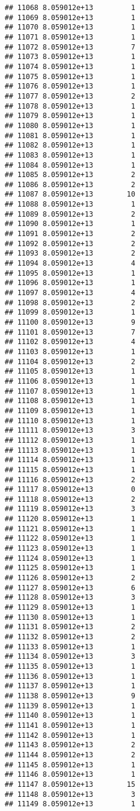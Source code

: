 \documentclass[
]{article}
\begin{document}
\begin{verbatim}
## 11068 8.059012e+13         1
## 11069 8.059012e+13         1
## 11070 8.059012e+13         1
## 11071 8.059012e+13         1
## 11072 8.059012e+13         7
## 11073 8.059012e+13         1
## 11074 8.059012e+13         1
## 11075 8.059012e+13         1
## 11076 8.059012e+13         1
## 11077 8.059012e+13         2
## 11078 8.059012e+13         1
## 11079 8.059012e+13         1
## 11080 8.059012e+13         1
## 11081 8.059012e+13         1
## 11082 8.059012e+13         1
## 11083 8.059012e+13         1
## 11084 8.059012e+13         1
## 11085 8.059012e+13         2
## 11086 8.059012e+13         2
## 11087 8.059012e+13        10
## 11088 8.059012e+13         1
## 11089 8.059012e+13         2
## 11090 8.059012e+13         1
## 11091 8.059012e+13         2
## 11092 8.059012e+13         2
## 11093 8.059012e+13         2
## 11094 8.059012e+13         4
## 11095 8.059012e+13         1
## 11096 8.059012e+13         1
## 11097 8.059012e+13         4
## 11098 8.059012e+13         2
## 11099 8.059012e+13         1
## 11100 8.059012e+13         9
## 11101 8.059012e+13         7
## 11102 8.059012e+13         4
## 11103 8.059012e+13         1
## 11104 8.059012e+13         2
## 11105 8.059012e+13         1
## 11106 8.059012e+13         1
## 11107 8.059012e+13         1
## 11108 8.059012e+13         1
## 11109 8.059012e+13         1
## 11110 8.059012e+13         1
## 11111 8.059012e+13         3
## 11112 8.059012e+13         1
## 11113 8.059012e+13         1
## 11114 8.059012e+13         1
## 11115 8.059012e+13         1
## 11116 8.059012e+13         2
## 11117 8.059012e+13         0
## 11118 8.059012e+13         2
## 11119 8.059012e+13         3
## 11120 8.059012e+13         1
## 11121 8.059012e+13         1
## 11122 8.059012e+13         1
## 11123 8.059012e+13         1
## 11124 8.059012e+13         1
## 11125 8.059012e+13         1
## 11126 8.059012e+13         2
## 11127 8.059012e+13         6
## 11128 8.059012e+13         3
## 11129 8.059012e+13         1
## 11130 8.059012e+13         1
## 11131 8.059012e+13         2
## 11132 8.059012e+13         2
## 11133 8.059012e+13         1
## 11134 8.059012e+13         3
## 11135 8.059012e+13         1
## 11136 8.059012e+13         1
## 11137 8.059012e+13         1
## 11138 8.059012e+13         9
## 11139 8.059012e+13         1
## 11140 8.059012e+13         1
## 11141 8.059012e+13         1
## 11142 8.059012e+13         1
## 11143 8.059012e+13         2
## 11144 8.059012e+13         2
## 11145 8.059012e+13         1
## 11146 8.059012e+13         1
## 11147 8.059012e+13        15
## 11148 8.059012e+13         3
## 11149 8.059012e+13         1

\end{verbatim}
\end{document}
